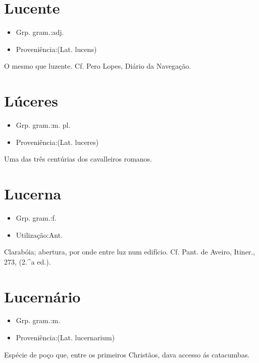 \section{Lucente}
\begin{itemize}
\item {Grp. gram.:adj.}
\end{itemize}
\begin{itemize}
\item {Proveniência:(Lat. \textunderscore lucens\textunderscore )}
\end{itemize}
O mesmo que \textunderscore luzente\textunderscore . Cf. Pero Lopes, \textunderscore Diário da Navegação\textunderscore .
\section{Lúceres}
\begin{itemize}
\item {Grp. gram.:m. pl.}
\end{itemize}
\begin{itemize}
\item {Proveniência:(Lat. \textunderscore luceres\textunderscore )}
\end{itemize}
Uma das três centúrias dos cavalleiros romanos.
\section{Lucerna}
\begin{itemize}
\item {Grp. gram.:f.}
\end{itemize}
\begin{itemize}
\item {Utilização:Ant.}
\end{itemize}
Clarabóia; abertura, por onde entre luz num edifício. Cf. Pant. de Aveiro, \textunderscore Itiner.\textunderscore , 273, (2.^a ed.).
\section{Lucernário}
\begin{itemize}
\item {Grp. gram.:m.}
\end{itemize}
\begin{itemize}
\item {Proveniência:(Lat. \textunderscore lucernarium\textunderscore )}
\end{itemize}
Espécie de poço que, entre os primeiros Christãos, dava accesso ás catacumbas.
